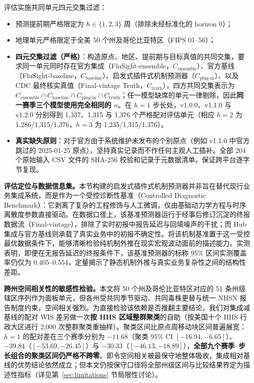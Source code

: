 \documentclass[11pt,a4paper]{article}
\theoremstyle{plain}
\theoremstyle{definition}
\begin{document}
评估实施共同单元四元交集过滤：
\begin{itemize}[leftmargin=*,itemsep=0.2pt,topsep=1pt,parsep=0pt]
\item 预测提前期严格限定为 $h \in \{1, 2, 3\}$ 周（排除未经标准化的 horizon 0）；
\item 地理单元严格限定于全美 50 个州及哥伦比亚特区（FIPS 01--56）；
\item \textbf{四元交集过滤（严格）}：构造原点、地区、提前期与目标真值的共同交集，要求同一单元同时存在官方集成（FluSight-ensemble，$C_{\text{ensemble}}$）、官方基线（FluSight-baseline，$C_{\text{baseline}}$）、启发式插件式机制预测器（$C_{\text{plug-in}}$）、以及 CDC 最终核实真值（Final-vintage Truth，$C_{\text{truth}}$），四方共同交集表示为 $C_{\text{ensemble}} \cap C_{\text{baseline}} \cap C_{\text{plug-in}} \cap C_{\text{truth}}$；任一模型缺席的单元一律剔除，因此\textbf{同一赛季三个模型使用完全相同的 $n$}。在 $h=1$ 步长处，v1.0.0、v1.1.0 与 v1.2.0 分别得到 1,337、1,315 与 1,376 个严格配对评估单元（相应 $h=2$ 为 1,286/1,315/1,376，$h=3$ 为 1,235/1,315/1,376）。
\item \textbf{真实缺失原则}：对于官方由于系统维护未发布的个别原点（例如 v1.1.0 中官方跳过的 2025-01-25 原点），坚持真实记录而不作任何主观人工插补。全部 204 个原始输入 CSV 文件的 SHA-256 校验和记录于元数据清单，保证跨平台逐字节复现。
\end{itemize}

\noindent\textbf{评估定位与数据信息集。}本节构建的启发式插件式机制预测器并非旨在替代现行业务集成系统，而是作为一个受控诊断性基准（Controlled Diagnostic Benchmark）：它剥离了复杂的工程修饰与人工微调，仅由基础动力学方程与时序离散度参数直接驱动。在数据口径上，该基准预测器运行于经事后修订沉淀的终报数据流（Final-vintage），排除了实时初报中报告延迟与回填噪声的干扰；而 Hub 集成与官方基线则承载了真实业务中的初报不确定性。将该机制基准置于这一受控最优数据条件下，能够清晰检验纯机制外推在现实宏观波动面前的描述能力。实测表明，即便在无报告延迟的终报条件下，该基准预测器的标称 95\% 区间实测覆盖率仍仅为 0.405--0.554，定量揭示了静态机制外推与真实业务复杂性之间的结构性差距。

\noindent\textbf{跨州空间相关性的敏感性检验。}本文将 50 个州及哥伦比亚特区对应的 51 条州级辖区序列作为面板单元，但各州受共同季节驱动、共同毒株更替与统一 NHSN 报告制度约束，空间相关强烈。为直接检验该依赖是否推翻主要结论，我们对集成减基线的配对 WIS 差另做一次\textbf{按 HHS 区域整群聚类}的自助（按美国十个 HHS 行政大区进行 2,000 次整群聚类重抽样）。聚类区间比原点周移动块区间普遍展宽：$h=1$ 的配对差在三个赛季分别为 $-11.68$（聚类 95\% CI $[-16.94, -6.65]$）、$-39.84$（$[-53.69, -26.45]$）与 $-30.33$（$[-46.13, -18.89]$），\textbf{全部九个赛季--步长组合的聚类区间仍严格不跨零}。即令空间相关被最保守地整体吸收，集成相对基线的优势结论依然成立；但本文仍按保守口径将全部州级区间与比较结果界定为描述性指标（详见第~\ref{sec:limitations} 节局限性讨论）。
\end{document}
